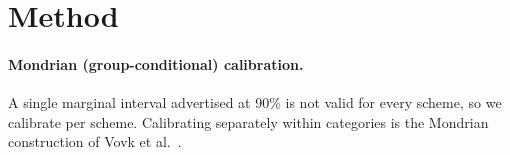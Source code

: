 \section{Method}
\paragraph{Mondrian (group-conditional) calibration.} A single marginal interval
advertised at 90\% is not valid for every scheme, so we calibrate per scheme.
Calibrating separately within categories is the Mondrian construction of
Vovk et al.~\cite{vovk2012conditional}.
